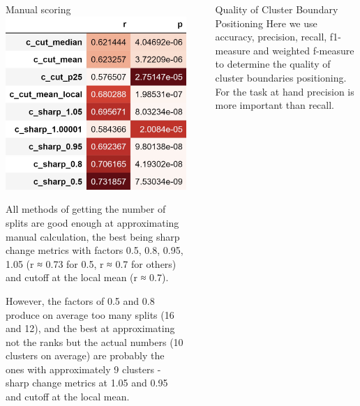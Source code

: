 \documentclass[xcolor=table]{beamer}
\newlength{\sepwidth}
\newcommand{\separatorcolumn}{\begin{column}{\sepwidth}\end{column}}
\begin{document}
\begin{frame}[t]
\begin{columns}[t]
\begin{column}{0.2\paperwidth}
\begin{block}{Manual scoring}
            \includegraphics[scale=0.9]{pic/correlation_with_correct_scoring.png}
            
            All methods of getting the number of splits are good enough at approximating manual calculation, the best being \alert{sharp change metrics with factors 0.5, 0.8}, 0.95, 1.05 (r ≈ 0.73 for 0.5, r ≈ 0.7 for others) and \alert{cutoff at the local mean} (r ≈ 0.7).
            
            However, the factors of 0.5 and 0.8 produce on average too many splits (16 and 12), and the best at approximating not the ranks but the actual numbers (10 clusters on average) are probably the ones with approximately 9  clusters - \alert{sharp change metrics at 1.05 and 0.95} and \alert{cutoff at the local mean}.
        \end{block}
    \end{column}
    \separatorcolumn
    \begin{column}{0.4\paperwidth}
        \begin{block}{Quality of Cluster Boundary Positioning}
            Here we use accuracy, precision, recall, f1-measure and weighted f-measure to determine the quality of cluster boundaries positioning. For the task at hand precision is more important than recall.
            

\end{block}
\end{column}
\end{columns}
\end{frame}
\end{document}
